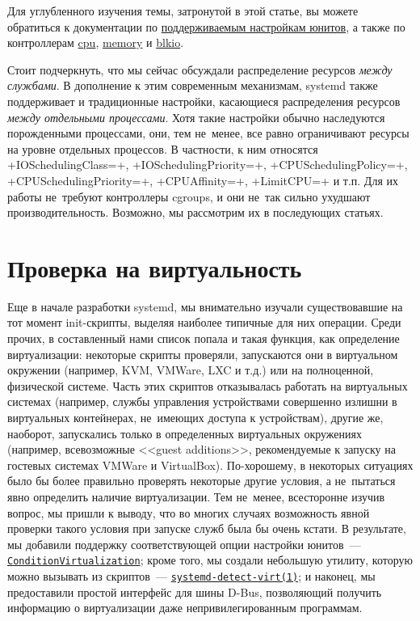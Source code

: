 \documentclass[10pt,oneside,a4paper]{article}
\newcommand{\hreftt}[2]{\href{#1}{\texttt{#2}}}
\begin{document}
Для углубленного изучения темы, затронутой в этой статье, вы можете обратиться к
документации по
\href{http://0pointer.de/public/systemd-man/systemd.exec.html}{поддерживаемым
настройкам юнитов}, а также по контроллерам 
\href{http://www.kernel.org/doc/Documentation/scheduler/sched-design-CFS.txt}{cpu},
\href{http://www.kernel.org/doc/Documentation/cgroups/memory.txt}{memory} и
\href{http://www.kernel.org/doc/Documentation/cgroups/blkio-controller.txt}{blkio}.

Стоит подчеркнуть, что мы сейчас обсуждали распределение ресурсов \emph{между
службами}. В дополнение к этим современным механизмам, systemd также
поддерживает и традиционные настройки, касающиеся распределения ресурсов
\emph{между отдельными процессами}. Хотя такие настройки обычно наследуются
порожденными процессами, они, тем не~менее, все равно ограничивают ресурсы
на уровне отдельных процессов. В частности, к ним относятся +IOSchedulingClass=+,
+IOSchedulingPriority=+, +CPUSchedulingPolicy=+, +CPUSchedulingPriority=+,
+CPUAffinity=+, +LimitCPU=+ и т.п. Для их работы не~требуют контроллеры cgroups,
и они не~так сильно ухудшают производительность. Возможно, мы рассмотрим их в
последующих статьях.

\section{Проверка на виртуальность}

Еще в начале разработки systemd, мы внимательно изучали существовавшие на тот
момент init-скрипты, выделяя наиболее типичные для них операции. Среди прочих, в
составленный нами список попала и такая функция, как определение виртуализации:
некоторые скрипты проверяли, запускаются они в виртуальном окружении (например,
KVM, VMWare, LXC и т.д.) или на полноценной, физической системе. Часть этих
скриптов отказывалась работать на виртуальных системах (например, службы
управления устройствами совершенно излишни в виртуальных контейнерах, не~имеющих
доступа к устройствам), другие же, наоборот, запускались только в определенных 
виртуальных окружениях (например, всевозможные <<guest additions>>,
рекомендуемые к запуску на гостевых системах VMWare и VirtualBox). По-хорошему,
в некоторых ситуациях было бы более правильно проверять некоторые другие
условия, а не~пытаться явно определить наличие виртуализации. Тем не~менее,
всесторонне изучив вопрос, мы пришли к выводу, что во многих случаях
возможность явной проверки такого условия при запуске служб была бы очень
кстати. В результате, мы добавили поддержку соответствующей опции настройки
юнитов~---
\hreftt{http://www.freedesktop.org/software/systemd/man/systemd.unit.html}{ConditionVirtualization};
кроме того, мы создали небольшую утилиту, которую можно вызывать из
скриптов~---
\hreftt{http://www.freedesktop.org/software/systemd/man/systemd-detect-virt.html}{systemd-detect-virt(1)};
и наконец, мы предоставили простой интерфейс для шины D-Bus, позволяющий
получить информацию о виртуализации даже непривилегированным программам. 
\end{document}
